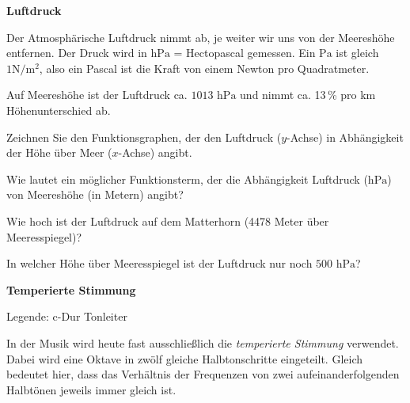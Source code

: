\bbwActAufgabenNr{} \textbf{Luftdruck}

Der Atmosphärische Luftdruck nimmt ab, je weiter wir uns von der
Meereshöhe entfernen. Der Druck wird in $\textrm{hPa}$ = Hectopascal
gemessen. Ein $\textrm{Pa}$ ist gleich $1 \textrm{N}/\textrm{m}^2$, also ein
Pascal ist die Kraft von einem Newton pro Quadratmeter.

Auf Meereshöhe ist der Luftdruck ca. $ 1013 \textrm{ hPa}$ und nimmt
ca. 13\,\% pro km Höhenunterschied ab.

\begin{bbwAufgabenBlock}

\item Zeichnen Sie den Funktionsgraphen, der den Luftdruck ($y$-Achse)
  in Abhängigkeit der Höhe über Meer ($x$-Achse) angibt.


\item Wie lautet ein möglicher Funktionsterm, der die Abhängigkeit
  Luftdruck ($\textrm{hPa}$) von Meereshöhe (in Metern) angibt?



\item Wie hoch ist der Luftdruck auf dem Matterhorn (4478 Meter über
  Meeresspiegel)?


\item In welcher Höhe über Meeresspiegel ist der Luftdruck nur noch
  $500 \textrm{ hPa}$?

  
\end{bbwAufgabenBlock}
\platzFuerBerechnungenBisEndeSeite{}



\bbwActAufgabenNr{} \textbf{Temperierte Stimmung}

\begin{center}Legende: c-Dur Tonleiter\end{center}


In der Musik wird heute fast ausschließlich die \textit{temperierte
  Stimmung} verwendet. Dabei wird eine Oktave in zwölf gleiche
Halbtonschritte eingeteilt. Gleich bedeutet hier, dass das Verhältnis
der Frequenzen von zwei aufeinanderfolgenden Halbtönen jeweils immer
gleich ist.

